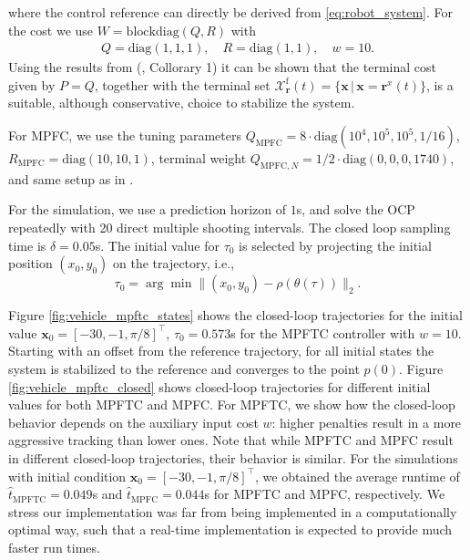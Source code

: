 \documentclass[journal]{IEEEtran}
\newcommand{\x}{{\mathbf{x}}}
\renewcommand{\r}{{\mathbf{r}}}
\newcommand{\review}[1]{#1}
\begin{document}
	where the control reference can directly be derived from \eqref{eq:robot_system}.
	For the cost we use $W = \mathrm{blockdiag}(Q,R)$ with
	\begin{gather*}\label{eq:tuning}
	Q=\mathrm{diag}(1,1,1),\quad
	R=\mathrm{diag}(1,1),\quad w=10.
	\end{gather*}
	Using the results from (\cite{Faulwasser2009}, Collorary 1) it can be shown that the terminal cost given by $P=Q$, together with the terminal set
	$\mathcal{X}^\mathrm{f}_\r(t) =\{ \x\, |\, \x=\r^x(t)\}$, is a suitable, although conservative, choice to stabilize the system. 
	
	For MPFC, we use the tuning parameters $Q_\mathrm{MPFC}=8\cdot{}\mathrm{diag}(10^4,10^5,10^5,1/16)$, $R_\mathrm{MPFC}=\mathrm{diag}(10,10,1)$, terminal weight $Q_{\mathrm{MPFC},N}=1/2\cdot{}\mathrm{diag}(0,0,0,1740)$, and same setup as in \cite{Faulwasser2009}.
	
	For the simulation, we use a prediction horizon of $1$s, and solve the OCP repeatedly with 20 direct multiple shooting intervals. The closed loop sampling time is \review{$\delta=0.05$s}. The initial value for $\tau_0$ is selected by projecting the initial position $(x_0,y_0)$ on the trajectory, i.e., $$\tau_0=\arg\min\|(x_0,y_0)-\rho(\theta(\tau))\|_2.$$ 
	
	
	Figure \ref{fig:vehicle_mpftc_states} shows the closed-loop trajectories for the initial value $\x_0=[-30,-1,\pi/8]^\top$, $\tau_0=0.573$s for the MPFTC controller with $w=10$. Starting with an offset from the reference trajectory, for all initial states the system is stabilized to the reference and converges to the point $p(0)$. Figure \ref{fig:vehicle_mpftc_closed} shows closed-loop trajectories for different initial values for both MPFTC and MPFC. For MPFTC, we show how the closed-loop behavior depends on the auxiliary input cost $w$: higher penalties result in a more aggressive tracking than lower ones. Note that while MPFTC and MPFC result in different closed-loop trajectories, their behavior is similar. For the simulations with initial condition $\x_0=[-30,-1,\pi/8]^\top$, we obtained the average runtime of $\hat{t}_\mathrm{MPFTC}=0.049$s and $\hat{t}_\mathrm{MPFC}=0.044$s for MPFTC and MPFC, respectively. We stress our implementation was far from being implemented in a computationally optimal way, such that a real-time implementation is expected to provide much faster run times.
	
\end{document}
